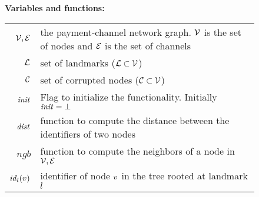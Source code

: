 \newcommand{\randkey}[0]{\ensuremath{\mathsf{r}}}
\newcommand{\hashfun}[0]{H}
\newcommand{\cpl}[0]{\textit{cpl}}
\begin{figure*}[htb]
	\begin{center}	
		\textbf{Variables and functions:}
		
		\begin{tabular}{r l}
			$\mathcal{V},\mathcal{E}$ & the payment-channel network graph. $\mathcal{V}$ is the set of nodes and $\mathcal{E}$ is the set of channels\\
			$\mathcal{L}$ & set of landmarks ($\mathcal{L} \subset \mathcal{V}$) \\
			$\mathcal{C}$ & set of corrupted nodes ($\mathcal{C} \subset \mathcal{V}$) \\
			$\mathit{init}$ & Flag to initialize the functionality. Initially $\mathit{init} = \bot$\\
			$\mathit{dist}$ & function to compute the distance between the identifiers of two nodes\\
			$\textit{ngb}$ & function to compute the neighbors of a node in $\mathcal{V},\mathcal{E}$\\
			$\mathit{id}_{l}(v)$ & identifier of node $v$ in the tree rooted at landmark $l$ 
		\end{tabular}
\end{center}
\end{figure*}
